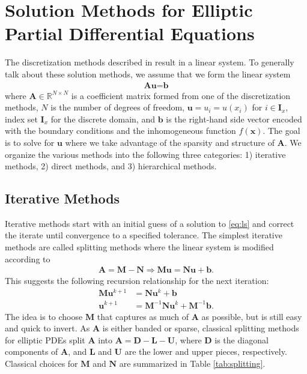 \section{Solution Methods for Elliptic Partial Differential Equations}
\label{sec:solution-methods-for-elliptic-pdes}

The discretization methods described in  result in a linear system. To generally talk about these solution methods, we assume that we form the linear system
\begin{align}
    \textbf{A} \textbf{u} = \textbf{b}
    \label{eq:ls}
\end{align}
where $\textbf{A} \in \mathbb{R}^{N \times N}$ is a coefficient matrix formed from one of the discretization methods, $N$ is the number of degrees of freedom, $\textbf{u} = u_i = u(x_i)$ for $i \in \textbf{I}_x$, index set $\textbf{I}_x$ for the discrete domain, and $\textbf{b}$ is the right-hand side vector encoded with the boundary conditions and the inhomogeneous function $f(\textbf{x})$. The goal is to solve for $\textbf{u}$ where we take advantage of the sparsity and structure of $\textbf{A}$. We organize the various methods into the following three categories: 1) iterative methods, 2) direct methods, and 3) hierarchical methods.

\subsection{Iterative Methods}
\label{sub:iterative-methods}

Iterative methods start with an initial guess of a solution to \ref{eq:ls} and correct the iterate until convergence to a specified tolerance. The simplest iterative methods are called splitting methods where the linear system is modified according to
\begin{align}
\textbf{A} = \textbf{M} - \textbf{N} \Rightarrow \textbf{M} \textbf{u} = \textbf{N} \textbf{u} + \textbf{b}.
\end{align}
This suggests the following recursion relationship for the next iteration:
\begin{align}
\textbf{M} \textbf{u}^{k+1} &= \textbf{N} \textbf{u}^k + \textbf{b} \\
\textbf{u}^{k+1} &= \textbf{M}^{-1} \textbf{N} \textbf{u}^k + \textbf{M}^{-1} \textbf{b}.
\end{align}
The idea is to choose $\textbf{M}$ that captures as much of $\textbf{A}$ as possible, but is still easy and quick to invert. As $\textbf{A}$ is either banded or sparse, classical splitting methods for elliptic PDEs split $\textbf{A}$ into $\textbf{A} = \textbf{D} - \textbf{L} - \textbf{U}$, where $\textbf{D}$ is the diagonal components of $\textbf{A}$, and $\textbf{L}$ and $\textbf{U}$ are the lower and upper pieces, respectively. Classical choices for $\textbf{M}$ and $\textbf{N}$ are summarized in Table \ref{tab:splitting}.

